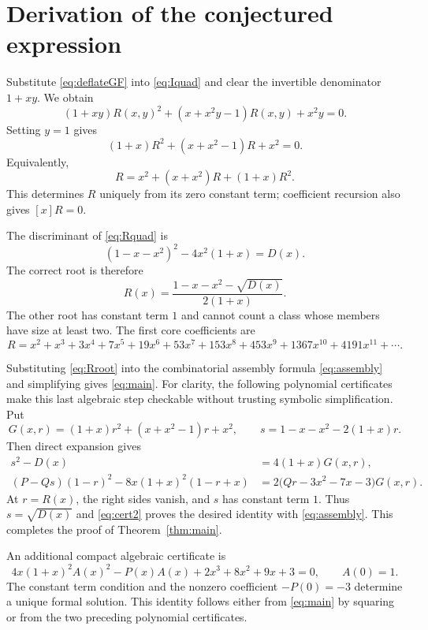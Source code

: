 \documentclass[11pt,a4paper]{article}
\theoremstyle{definition}
\theoremstyle{remark}
\begin{document}
\section{Derivation of the conjectured expression}

Substitute \eqref{eq:deflateGF} into \eqref{eq:Iquad} and clear the
invertible denominator $1+xy$. We obtain
\begin{equation}\label{eq:Rquad-biv}
 (1+xy)R(x,y)^2+(x+x^2y-1)R(x,y)+x^2y=0.
\end{equation}
Setting $y=1$ gives
\begin{equation}\label{eq:Rquad}
 \boxed{(1+x)R^2+(x+x^2-1)R+x^2=0.}
\end{equation}
Equivalently,
\begin{equation}\label{eq:Rpositive}
 R=x^2+(x+x^2)R+(1+x)R^2.
\end{equation}
This determines $R$ uniquely from its zero constant term; coefficient
recursion also gives $[x]R=0$.

The discriminant of \eqref{eq:Rquad} is
\[
 (1-x-x^2)^2-4x^2(1+x)=D(x).
\]
The correct root is therefore
\begin{equation}\label{eq:Rroot}
 R(x)=\frac{1-x-x^2-\sqrt{D(x)}}{2(1+x)}.
\end{equation}
The other root has constant term $1$ and cannot count a class whose members
have size at least two. The first core coefficients are
\[
 R=x^2+x^3+3x^4+7x^5+19x^6+53x^7+153x^8+453x^9
       +1367x^{10}+4191x^{11}+\cdots.
\]

Substituting \eqref{eq:Rroot} into the combinatorial assembly formula
\eqref{eq:assembly} and simplifying gives \eqref{eq:main}. For clarity,
the following polynomial certificates make this last algebraic step
checkable without trusting symbolic simplification. Put
\[
 G(x,r)=(1+x)r^2+(x+x^2-1)r+x^2,
 \qquad s=1-x-x^2-2(1+x)r.
\]
Then direct expansion gives
\begin{align}
 s^2-D(x)&=4(1+x)G(x,r),\label{eq:cert1}\\
 (P-Qs)(1-r)^2-8x(1+x)^2(1-r+x)
 &=2\bigl(Qr-3x^2-7x-3\bigr)G(x,r).\label{eq:cert2}
\end{align}
At $r=R(x)$, the right sides vanish, and $s$ has constant term $1$.
Thus $s=\sqrt{D(x)}$ and \eqref{eq:cert2} proves the desired identity
with \eqref{eq:assembly}. This completes the proof of
Theorem~\ref{thm:main}.

An additional compact algebraic certificate is
\begin{equation}\label{eq:Aquad}
 4x(1+x)^2 A(x)^2-P(x)A(x)+2x^3+8x^2+9x+3=0,
 \qquad A(0)=1.
\end{equation}
The constant term condition and the nonzero coefficient $-P(0)=-3$
determine a unique formal solution. This identity follows either from
\eqref{eq:main} by squaring or from the two preceding polynomial
certificates.
\end{document}
